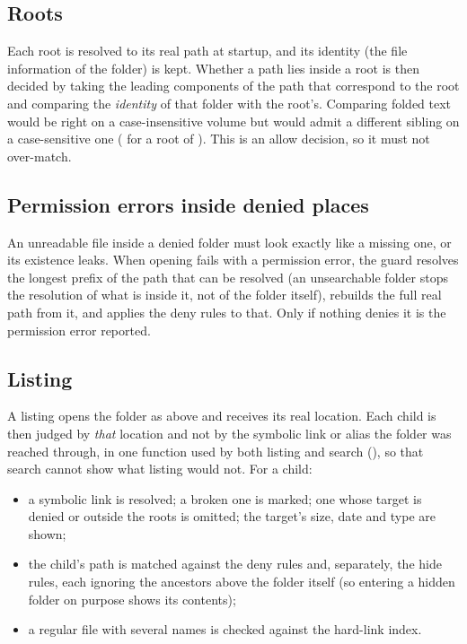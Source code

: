\subsection{Roots}
\label{sec:roots}

Each root is resolved to its real path at startup, and its identity (the file
information of the folder) is kept.  Whether a path lies inside a root is then decided
by taking the leading components of the path that correspond to the root and
comparing the \emph{identity} of that folder with the root's.  Comparing folded text
would be right on a case-insensitive volume but would admit a different sibling on a
case-sensitive one ( for a root of ).  This is an allow
decision, so it must not over-match.

\subsection{Permission errors inside denied places}
\label{sec:ancestor}

An unreadable file inside a denied folder must look exactly like a missing one, or its
existence leaks.  When opening fails with a permission error, the guard resolves the
longest prefix of the path that can be resolved (an unsearchable folder stops the
resolution of what is inside it, not of the folder itself), rebuilds the full real
path from it, and applies the deny rules to that.  Only if nothing denies it is the
permission error reported.

\subsection{Listing}

A listing opens the folder as above and receives its real location.  Each child is
then judged by \emph{that} location and not by the symbolic link or alias the folder
was reached through, in one function used by both listing and search
(), so that search cannot show what listing would not.  For a child:

\begin{itemize}
  \item a symbolic link is resolved; a broken one is marked; one whose target is denied
        or outside the roots is omitted; the target's size, date and type are shown;
  \item the child's path is matched against the deny rules and, separately, the hide
        rules, each ignoring the ancestors above the folder itself (so entering a hidden
        folder on purpose shows its contents);
  \item a regular file with several names is checked against the hard-link index.
\end{itemize}

